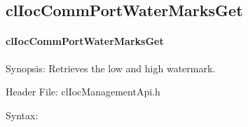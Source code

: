 \begin{flushleft}
\subsection{clIocCommPortWaterMarksGet}
\hypertarget{pageioc201}{}\paragraph{cl\-Ioc\-Comm\-Port\-Water\-Marks\-Get}\label{pageioc201}
\begin{Desc}
\item[Synopsis:]Retrieves the low and high watermark.\end{Desc}
\begin{Desc}
\item[Header File:]clIocManagementApi.h\end{Desc}
\begin{Desc}
\item[Syntax:]


\end{Desc}
\end{flushleft}
